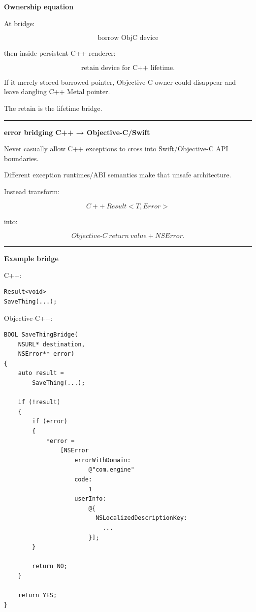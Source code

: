 \textbf{Ownership equation}

At bridge:

\[
\boxed{
\text{borrow ObjC device}
}
\]

then inside persistent C++ renderer:

\[
\boxed{
\text{retain device for C++ lifetime}.
}
\]

If it merely stored borrowed pointer, Objective-C owner could disappear and leave dangling C++ Metal pointer.

The retain is the lifetime bridge.

\begin{center}\rule{0.5\linewidth}{0.5pt}\end{center}

\textbf{error bridging C++ → Objective-C/Swift}

Never casually allow C++ exceptions to cross into Swift/Objective-C API boundaries.

Different exception runtimes/ABI semantics make that unsafe architecture.

Instead transform:

\[
C++\ Result<T,Error>
\]

into:

\[
Objective\text{-}C\ return\ value
+
NSError.
\]

\begin{center}\rule{0.5\linewidth}{0.5pt}\end{center}

\textbf{Example bridge}

C++:

\begin{verbatim}
Result<void>
SaveThing(...);
\end{verbatim}

Objective-C++:

\begin{verbatim}
BOOL SaveThingBridge(
    NSURL* destination,
    NSError** error)
{
    auto result =
        SaveThing(...);

    if (!result)
    {
        if (error)
        {
            *error =
                [NSError
                    errorWithDomain:
                        @"com.engine"
                    code:
                        1
                    userInfo:
                        @{
                          NSLocalizedDescriptionKey:
                            ...
                        }];
        }

        return NO;
    }

    return YES;
}
\end{verbatim}

